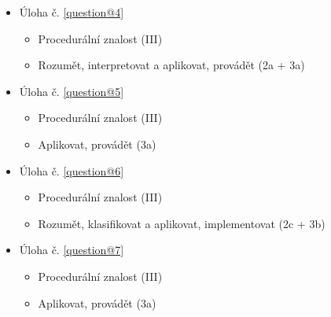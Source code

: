 \documentclass[12pt,a4paper,addpoints]{exam}
\begin{document}
\begin{titlepage}
\begin{center}
\begin{itemize}[noitemsep,topsep=0pt]
\begin{itemize}[noitemsep,topsep=0pt]
                                \end{itemize}
                        \item Úloha č. \ref{question@4}\\
                                \begin{itemize}[noitemsep,topsep=0pt]
                                        \item Procedurální znalost (III)
                                        \item Rozumět, interpretovat a aplikovat, provádět (2a + 3a)
                                \end{itemize}
                        \item Úloha č. \ref{question@5}\\
                                \begin{itemize}[noitemsep,topsep=0pt]
                                        \item Procedurální znalost (III)
                                        \item Aplikovat, provádět (3a)
                                \end{itemize}
                        \item Úloha č. \ref{question@6}\\
                                \begin{itemize}[noitemsep,topsep=0pt]
                                        \item Procedurální znalost (III)
                                        \item Rozumět, klasifikovat a aplikovat, implementovat (2c + 3b)
                                \end{itemize}
                        \item Úloha č. \ref{question@7}\\
                                \begin{itemize}[noitemsep,topsep=0pt]
                                        \item Procedurální znalost (III)
                                        \item Aplikovat, provádět (3a)
                                \end{itemize}
                        \end{itemize}
        \end{center}
    \end{titlepage}

    
    

    \printanswers
    
    
\end{document}

